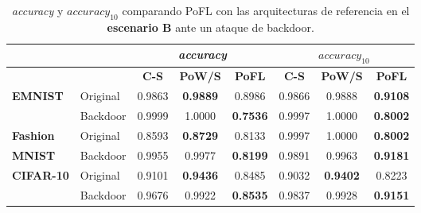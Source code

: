 \begin{table}

    \centering
    \begin{tabular}{llcccccc}
    	\toprule
           &&\multicolumn{3}{c}{\textit{accuracy}}&  \multicolumn{3}{c}{\textit{$accuracy_{10}$}}\\
           \toprule
           &&\textbf{C-S} &  \textbf{PoW/S} &  \textbf{PoFL} &  \textbf{C-S} &  \textbf{PoW/S} & \textbf{PoFL} 
\\
\toprule
           \textbf{EMNIST} &Original 
&0.9863        &  \textbf{0.9889}  &  0.8986&  0.9866        &  0.9888  & \textbf{0.9108} 
\\
           &Backdoor 
&0.9999        &  1.0000     &  \textbf{0.7536}   &  0.9997        &  1.0000     & \textbf{0.8002} 
\\
\midrule
           \textbf{Fashion}   &Original 
&0.8593        &  \textbf{0.8729}  &  0.8133    &  0.9997        &  1.0000     & \textbf{0.8002} 
\\
           \textbf{MNIST}    &Backdoor 
&0.9955        &  0.9977  &  \textbf{0.8199} &  0.9891        &  0.9963  & \textbf{0.9181}
\\
\midrule
           \textbf{CIFAR-10}        &Original 
&0.9101        &  \textbf{0.9436}  &  0.8485  &  0.9032        &  \textbf{0.9402}  & 0.8223 
\\
           &Backdoor &0.9676        &  0.9922  &  \textbf{0.8535}   &  0.9837        &  0.9928  & \textbf{0.9151} \\
           \bottomrule
    \end{tabular}
    \caption{\textit{accuracy} y \textit{$accuracy_{10}$} comparando PoFL con las arquitecturas de referencia en el \textbf{escenario B} ante un ataque de backdoor.}\label{tab:poflbackdoor_b}
\end{table}


